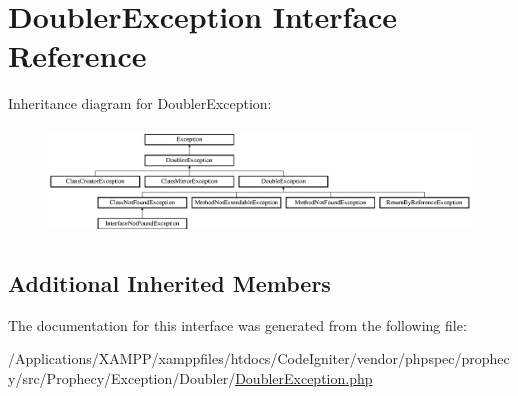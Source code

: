 \hypertarget{interface_prophecy_1_1_exception_1_1_doubler_1_1_doubler_exception}{}\section{Doubler\+Exception Interface Reference}
\label{interface_prophecy_1_1_exception_1_1_doubler_1_1_doubler_exception}
Inheritance diagram for Doubler\+Exception\+:\begin{figure}[H]
\begin{center}
\leavevmode
\includegraphics[height=2.828283cm]{interface_prophecy_1_1_exception_1_1_doubler_1_1_doubler_exception}
\end{center}
\end{figure}
\subsection*{Additional Inherited Members}


The documentation for this interface was generated from the following file\+:\begin{DoxyCompactItemize}
\item 
/\+Applications/\+X\+A\+M\+P\+P/xamppfiles/htdocs/\+Code\+Igniter/vendor/phpspec/prophecy/src/\+Prophecy/\+Exception/\+Doubler/\mbox{\hyperlink{_doubler_exception_8php}{Doubler\+Exception.\+php}}\end{DoxyCompactItemize}
